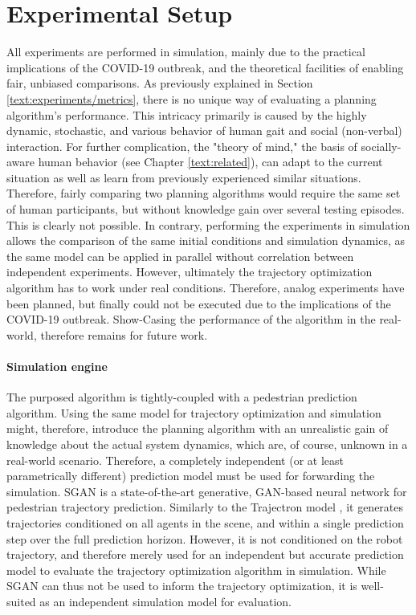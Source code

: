 \section{Experimental Setup}
\label{text:experiments/setup}
All experiments are performed in simulation, mainly due to the practical implications of the COVID-19 outbreak, and the theoretical facilities of enabling fair, unbiased comparisons. As previously explained in Section \ref{text:experiments/metrics}, there is no unique way of evaluating a planning algorithm's performance. This intricacy primarily is caused by the highly dynamic, stochastic, and various behavior of human gait and social (non-verbal) interaction. For further complication, the "theory of mind," the basis of socially-aware human behavior (see Chapter \ref{text:related}), can adapt to the current situation as well as learn from previously experienced similar situations. Therefore, fairly comparing two planning algorithms would require the same set of human participants, but without knowledge gain over several testing episodes. This is clearly not possible. In contrary, performing the experiments in simulation allows the comparison of the same initial conditions and simulation dynamics, as the same model can be applied in parallel without correlation between independent experiments. 
\newline
However, ultimately the trajectory optimization algorithm has to work under real conditions. Therefore, analog experiments have been planned, but finally could not be executed due to the implications of the COVID-19 outbreak. Show-Casing the performance of the algorithm in the real-world, therefore remains for future work.

\paragraph{Simulation engine}
The purposed algorithm is tightly-coupled with a pedestrian prediction algorithm. Using the same model for trajectory optimization and simulation might, therefore, introduce the planning algorithm with an unrealistic gain of knowledge about the actual system dynamics, which are, of course, unknown in a real-world scenario. Therefore, a completely independent (or at least parametrically different) prediction model must be used for forwarding the simulation. \ac{SGAN} \cite{Gupta2018} is a state-of-the-art generative, \ac{GAN}-based neural network for pedestrian trajectory prediction. Similarly to the Trajectron model \cite{Salzmann2020}, it generates trajectories conditioned on all agents in the scene, and within a single prediction step over the full prediction horizon. However, it is not conditioned on the robot trajectory, and therefore merely used for an independent but accurate prediction model to evaluate the trajectory optimization algorithm in simulation. While \ac{SGAN} can thus not be used to inform the trajectory optimization, it is well-suited as an independent simulation model for evaluation. 

